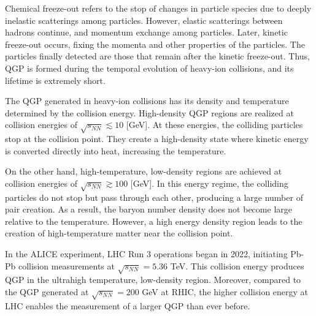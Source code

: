         Chemical freeze-out refers to the stop of changes in particle species due to deeply inelastic scatterings among particles. However, elastic scatterings between hadrons continue, and momentum exchange among particles. Later, kinetic freeze-out occurs, fixing the momenta and other properties of the particles. The particles finally detected are those that remain after the kinetic freeze-out. Thus, QGP is formed during the temporal evolution of heavy-ion collisions, and its lifetime is extremely short. 
        
        
        
        The QGP generated in heavy-ion collisions has its density and temperature determined by the collision energy. High-density QGP regions are realized at collision energies of $\sqrt{s_{NN}} \lesssim 10$ [GeV]. At these energies, the colliding particles stop at the collision point. They create a high-density state where kinetic energy is converted directly into heat, increasing the temperature.  
  
        On the other hand, high-temperature, low-density regions are achieved at collision energies of $\sqrt{s_{NN}} \gtrsim 100$ [GeV]. In this energy regime, the colliding particles do not stop but pass through each other, producing a large number of pair creation. As a result, the baryon number density does not become large relative to the temperature. However, a high energy density region leads to the creation of high-temperature matter near the collision point.  
        
        In the ALICE experiment, LHC Run 3 operations began in 2022, initiating Pb-Pb collision measurements at $\sqrt{s_{NN}} = 5.36$ TeV. This collision energy produces QGP in the ultrahigh temperature, low-density region. Moreover, compared to the QGP generated at $\sqrt{s_{NN}} = 200$ GeV at RHIC, the higher collision energy at LHC enables the measurement of a larger QGP than ever before.

